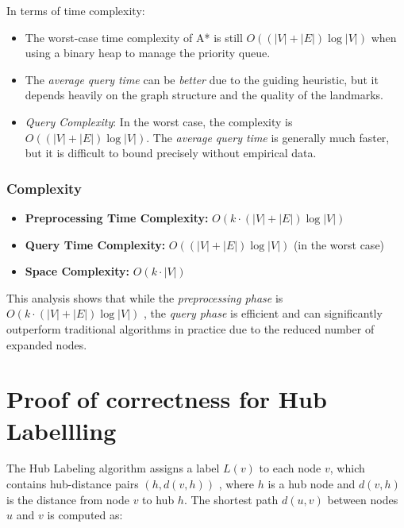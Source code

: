 \begin{appendices}
	In terms of time complexity:
	\begin{itemize}
		\item The worst-case time complexity of A* is still $ O((|V| + |E|) \log |V|) $ when using a binary heap to manage the priority queue.
		\item The \textit{average query time} can be \textit{better} due to the guiding heuristic, but it depends heavily on the graph structure and the quality of the landmarks.
		\item \textit{Query Complexity}:  In the worst case, the complexity is $ O((|V| + |E|) \log |V|) $. The \textit{average query time} is generally much faster, but it is difficult to bound precisely without empirical data.
	
		\end{itemize}
	\subsubsection{Complexity}
	\begin{itemize}
		\item \textbf{Preprocessing Time Complexity:} $ O(k \cdot (|V| + |E|) \log |V|) $
		\item \textbf{Query Time Complexity:} $ O((|V| + |E|) \log |V|) $ (in the worst case)
		\item \textbf{Space Complexity:} $ O(k \cdot |V|) $
	\end{itemize}
	
	This analysis shows that while the \textit{preprocessing phase} is $ O(k \cdot (|V| + |E|) \log |V|) $ , the \textit{query phase} is efficient and can significantly outperform traditional algorithms in practice due to the reduced number of expanded nodes.
	
	




	
	
	



\section{Proof of correctness for Hub Labellling}\label{appendix:Hub Labelling:correctness}

	The Hub Labeling algorithm assigns a label $ L(v) $ to each node $ v $, which contains hub-distance pairs $ (h, d(v, h)) $ , where $ h $ is a hub node and $ d(v, h) $ is the distance from node $ v $ to hub $ h $. The shortest path $ d(u, v) $ between nodes $ u $ and $ v $ is computed as:


\end{appendices}

